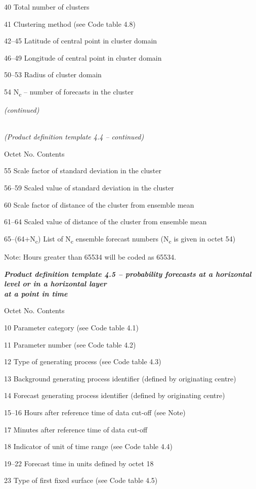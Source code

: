 40 Total number of clusters

41 Clustering method (see Code table 4.8)

42--45 Latitude of central point in cluster domain

46--49 Longitude of central point in cluster domain

50--53 Radius of cluster domain

54 N\textsubscript{c} -- number of forecasts in the cluster

\emph{(continued)}

\emph{\\
(Product definition template 4.4 -- continued)}

Octet No. Contents

55 Scale factor of standard deviation in the cluster

56--59 Scaled value of standard deviation in the cluster

60 Scale factor of distance of the cluster from ensemble mean

61--64 Scaled value of distance of the cluster from ensemble mean

65--(64+N\textsubscript{c}) List of N\textsubscript{c} ensemble forecast numbers (N\textsubscript{c} is given in octet 54)

Note: Hours greater than 65534 will be coded as 65534.

\emph{\textbf{Product definition template 4.5 -- probability forecasts at a horizontal level or in a horizontal layer\\
at a point in time}}

Octet No. Contents

10 Parameter category (see Code table 4.1)

11 Parameter number (see Code table 4.2)

12 Type of generating process (see Code table 4.3)

13 Background generating process identifier (defined by originating centre)

14 Forecast generating process identifier (defined by originating centre)

15--16 Hours after reference time of data cut-off (see Note)

17 Minutes after reference time of data cut-off

18 Indicator of unit of time range (see Code table 4.4)

19--22 Forecast time in units defined by octet 18

23 Type of first fixed surface (see Code table 4.5)

